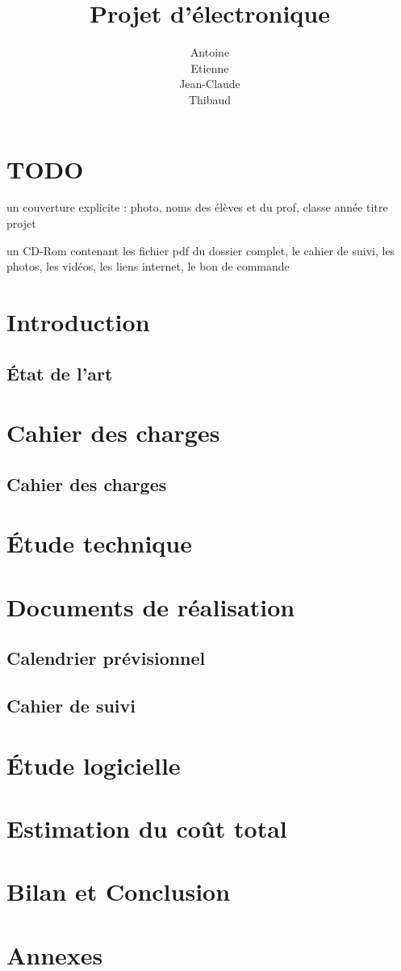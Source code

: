 \documentclass[12pt,titlepage,a4paper]{report}
\title{Projet d'électronique}
\author{Antoine \bsc{Augusti}\\ Etienne \bsc{Batise}\\ Jean-Claude \bsc{Bernard}\\ Thibaud \bsc{Dauce}}
\begin{document}

	\dominitoc
	\tableofcontents

	\setcounter{page}{1}
	\part{TODO}
	un couverture explicite : photo, noms des élèves et du prof, classe année titre projet

	un CD-Rom contenant les fichier pdf du dossier complet, le cahier de suivi, les photos, les vidéos, les liens internet, le bon de commande

	\part{Introduction}
	\chapter{État de l'art}
	\minitoc
	

	\part{Cahier des charges}
	\chapter{Cahier des charges}
	

	\part{Étude technique}

	\part{Documents de réalisation}

	\chapter{Calendrier prévisionnel}
	
	\chapter{Cahier de suivi}
	\minitoc
	

	\part{Étude logicielle}

	\part{Estimation du coût total}

	\part{Bilan et Conclusion}

	\part{Annexes}
\end{document}
